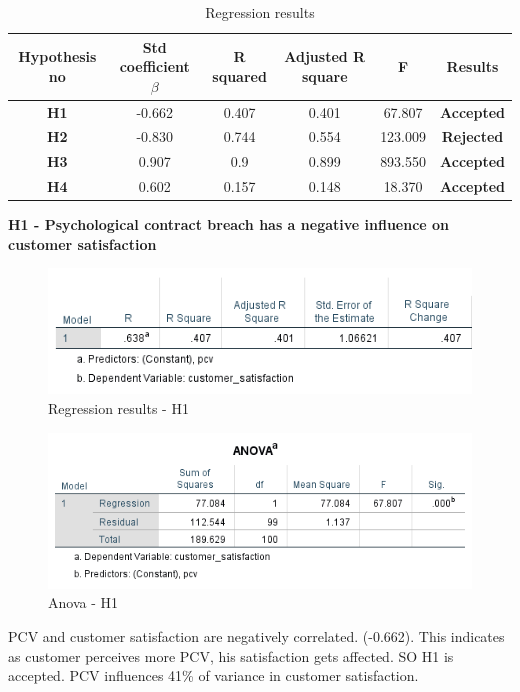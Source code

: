 \documentclass[a4paper, 14pt]{article}
\begin{document}
{\begin{table}[H]
\centering
\begin{tabular}{|c|c|c|c|c|c|}
\hline
Hypothesis no & Std coefficient $\beta$  & R squared & Adjusted R square & F & Results \\
\hline
\textbf{H1} & -0.662 & 0.407 & 0.401 & 67.807 & \textbf{Accepted} \\
\hline
\textbf{H2} & -0.830 & 0.744 & 0.554 & 123.009 & \textbf{Rejected} \\
\hline
\textbf{H3} & 0.907 & 0.9 & 0.899 & 893.550 & \textbf{Accepted} \\
\hline
\textbf{H4} & 0.602 & 0.157 & 0.148 & 18.370 & \textbf{Accepted} \\
\hline 
\end{tabular}
\caption{Regression results}
\end{table}
\newpage
\par \textbf{H1 - Psychological contract breach has a negative influence on customer satisfaction}\\
\begin{figure}[H]
\centering
\includegraphics[scale=1]{pcv_vs_customer_satisfaction.png}
\caption{Regression results - H1}
\end{figure}

\begin{figure}[H]
\centering
\includegraphics[scale=1]{anova_pcv_cs.png}
\caption{Anova - H1}
\end{figure}

PCV and customer satisfaction are negatively correlated. (-0.662). This indicates as customer perceives more PCV, his satisfaction gets affected. SO H1 is accepted.
PCV influences 41\% of variance in customer satisfaction.\\

}
\end{document}
